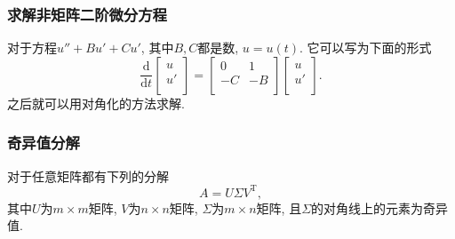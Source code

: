 \subsubsection{求解非矩阵二阶微分方程}
对于方程$u'' + B u' + C u'$, 其中$B, C$都是数, $u= u\left( t \right) $.
它可以写为下面的形式
\begin{equation}
    \frac{\mathrm{d}}{\mathrm{d} t} \begin{bmatrix}
     u\\
     u'\\
    \end{bmatrix}
    =
    \begin{bmatrix}
     0 & 1\\
     -C & -B\\
    \end{bmatrix}
    \begin{bmatrix}
     u\\
     u'\\
    \end{bmatrix}.
\end{equation}
之后就可以用对角化的方法求解.

\subsubsection{奇异值分解}
对于任意矩阵都有下列的分解
\begin{equation}
    A = U \Sigma V ^{\mathrm{T}},
\end{equation}
其中$U$为$m \times m$矩阵, $V$为$n \times n$矩阵, $\Sigma$为$m \times n$矩阵, 且$\Sigma$的对角线上的元素为奇异值.


